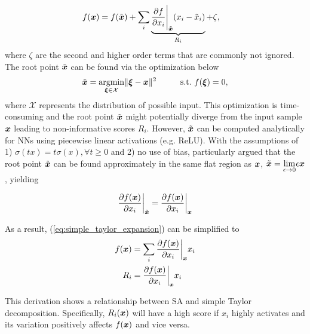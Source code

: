 \begin{align} \label{eq:simple_taylor_expansion}
	f(\patvector{x}) 	&= f(\tilde{\patvector{x}}) + \sum_{i} \underbrace{\frac{\partial f }{ \partial x_i } \Bigg|_{\tilde{\patvector{x}}}  ( x_i - \tilde{x}_i ) }_{R_i} + \zeta, 
\end{align}
where $\zeta$ are the second and higher order terms that are commonly not ignored. The root point $\tilde{\patvector{x}}$ can be found via the optimization below 
\begin{align*}
\tilde{\patvector{x}} = \underset{\patvector{\xi} \in \mathcal{X} }{\text{argmin}}  \| \patvector{\xi} - \patvector{x} \|^2 \hspace{1cm}  \text{s.t.}\  f(\patvector{\xi}) = 0,
\end{align*}
where $\mathcal{X}$ represents the distribution of possible input. This optimization is time-consuming  and the root point $\tilde{\patvector{x}}$ might potentially diverge from the input sample $\patvector{x}$ leading to  non-informative scores $R_i$. However, $\tilde{\patvector{x}}$ can be computed analytically for NNs using piecewise linear activations (e.g. ReLU). With the assumptions of 1) $\sigma(tx) = t\sigma(x) ,\forall t \ge 0$ and 2) no use of bias, \citet{MontavonMethodsinterpretingunderstanding2018} particularly argued that  the root point $\tilde{\patvector{x}}$ can be found approximately in the same flat region as $\patvector{x}$, $\tilde{\patvector{x}} = \underset{\epsilon \rightarrow 0 }{\lim} \epsilon \x$, yielding

\begin{align*}
	\frac{\partial f(\patvector{x})}{\partial x_i}\bigg|_{\tilde{\patvector{x}}} = \frac{\partial f(\patvector{x})}{\partial x_i}\bigg|_{\patvector{x}} 
\end{align*}

%
As a result, (\ref{eq:simple_taylor_expansion}) can be simplified to
\begin{align}
	f(\patvector{x}) &= \sum_{i} \frac{\partial f(\patvector{x})}{\partial x_i}\bigg|_{\patvector{x}}  x_i \nonumber \\
	R_i &= \frac{\partial f(\patvector{x})}{\partial x_i}\bigg|_{\patvector{x}}  x_i \label{eq:simple_r_i}
\end{align}

This derivation shows a relationship between SA and simple Taylor decomposition. Specifically, $R_i(\boldsymbol{x})$ will have a high score if $x_i$ highly activates and its variation positively affects $f(\boldsymbol{x})$ and vice versa.


